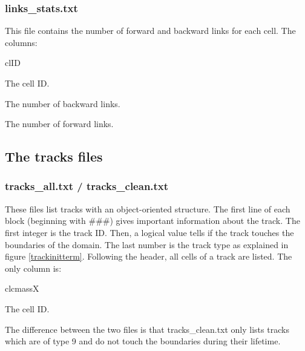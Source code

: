 \documentclass{scrartcl}
\begin{document}
\subsubsection{links\_stats.txt}
This file contains the number of forward and backward links for each cell. The columns:
\begin{labeling}{clID}
	\item[clID] The cell ID.
	\item[nbw] The number of backward links.
	\item[nfw] The number of forward links.

\end{labeling}

\subsection{The tracks files}
\subsubsection{tracks\_all.txt / tracks\_clean.txt}
These files list tracks with an object-oriented structure. The first line of each block (beginning with \#\#\#) gives important information about the track. The first integer is the track ID. Then, a logical value tells if the track touches the boundaries of the domain. The last number is the track type as explained in figure \ref{trackinitterm}. Following the header, all cells of a track are listed. The only column is:
\begin{labeling}{clcmassX}
	\item[clID] The cell ID.
\end{labeling}
The difference between the two files is that tracks\_clean.txt only lists tracks which are of type 9 and do not touch the boundaries during their lifetime. 
\end{document}
